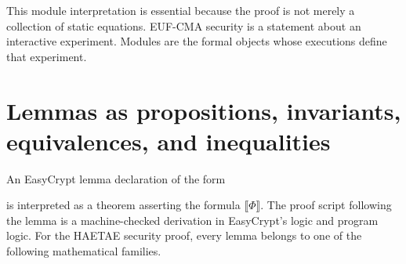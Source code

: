 This module interpretation is essential because the proof is not merely a
collection of static equations.  EUF-CMA security is a statement about an
interactive experiment.  Modules are the formal objects whose executions define
that experiment.

\section{Lemmas as propositions, invariants, equivalences, and inequalities}
\label{app:lemmas-as-theorems}

An EasyCrypt lemma declaration of the form
\begin{center}
\end{center}
is interpreted as a theorem asserting the formula
\(\llbracket \Phi \rrbracket\).  The proof script following the lemma is a
machine-checked derivation in EasyCrypt's logic and program logic.  For the
HAETAE security proof, every lemma belongs to one of the following mathematical
families.

